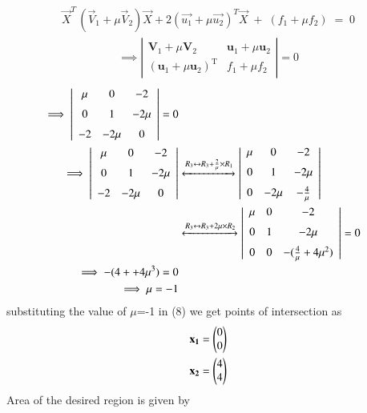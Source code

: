 \documentclass[journal]{IEEEtran}
\begin{document}
\begin{align}
\vec{X}^{T}\,(\vec{V}_{1} + \mu \vec{V}_{2})\vec{X} + 2(\vec{u_1} + \mu \vec{u_2})^{T}\vec{X} \;+\; (f_{1} + \mu f_{2}) \;=\; 0
\end{align}
\begin{align}
\implies \left|
\begin{array}{cc}
\mathbf{V}_1 + \mu \mathbf{V}_2 & \mathbf{u}_1 + \mu \mathbf{u}_2 \\[6pt]
(\mathbf{u}_1 + \mu \mathbf{u}_2)^{\mathrm{T}} & f_1 + \mu f_2
\end{array}
\right| = 0
\end{align}
\begin{align}
    \implies 
\left|
\begin{array}{ccc}
\mu & 0 & -2 \\[6pt]
0 & 1  & -2\mu \\[6pt]
-2 & -2\mu & 0
\end{array}
\right| = 0 \\
\implies \left|
\begin{array}{ccc}
\mu & 0 & -2 \\[6pt]
0 & 1  & -2\mu \\[6pt]
-2 & -2\mu & 0
\end{array}
\right| &\xleftrightarrow{R_3 \leftrightarrow R_3 + \frac{2}{\mu}\times R_1} \left|
\begin{array}{ccc}
\mu & 0 & -2 \\[6pt]
0 & 1  & -2\mu \\[6pt]
0 & -2\mu & -\frac{4}{\mu}
\end{array}
\right|\\
&\xleftrightarrow{R_3 \leftrightarrow R_3 + 2\mu \times R_2} \left|
\begin{array}{ccc}
\mu & 0 & -2 \\[6pt]
0 & 1  & -2\mu \\[6pt]
0 & 0 & -(\frac{4}{\mu} +4 \mu ^2)
\end{array}
\right| =0\\
\implies -(4 + +4 \mu ^3)=0\\
\implies \mu=-1
\end{align}
substituting the value of $\mu$=-1 in (8) we get points of intersection as 
\begin{align}
    \mathbf{x_1}=\begin{pmatrix}0\\0\end{pmatrix} \\
    \mathbf{x_2}=\begin{pmatrix}4\\4\end{pmatrix}
\end{align}
Area of the desired region is given by
\end{document}
